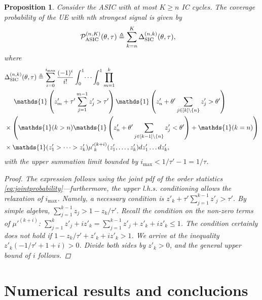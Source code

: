 \documentclass[lettersize,journal]{IEEEtran}
\newtheorem{prop}[theorem]{Proposition}
\begin{document}
\begin{prop}
  Consider the ASIC with at most $K \geq n$ IC cycles. The coverage probability of the UE with n\textit{th} strongest signal is given by
  \begin{align}
    &\mathcal{P}^{(n,K)}_{\textup{ASIC}}(\theta,\tau) \triangleq \sum_{k=n}^{K}\Delta^{(n,k)}_{\textup{SIC}}(\theta,\tau),
  \end{align}
  where
  \begin{align}
    \label{eq:SICprob}
    & \Delta^{(n,k)}_{\textup{SIC}}(\theta,\tau) \triangleq \sum^{i_{\text{max}}}_{i=0}\frac{(-1)^i}{i!} \int_{0}^{1} \dots \int_{0}^{1}\prod_{m=1}^k  \nonumber \\
    &\hspace{0.5cm}\mathds{1}\left( z'_m+ \tau'\sum_{j=1}^{m-1} z'_j>\tau' \right)  \mathds{1}\left(z'_n+  \theta'\sum_{j\in [k] \setminus \{n\}} z'_j>\theta' \right) \nonumber \\
    &\times \left(\mathds{1}(k>n)\mathds{1}\left(z'_n+ \theta'\sum_{j \in [k-1] \setminus \{n\}} z'_j<\theta' \right) + \mathds{1}(k=n) \right) \nonumber\\
    & \times \mathds{1}(z'_1>\dots>z'_k){\mu'}_k^{(k+i)}(z'_1,\dots,z'_k) d z'_1 \dots d z'_k,
  \end{align}
  with the upper summation limit bounded by $i_{\text{max}} < 1/\tau'-1=1/\tau$.
  \begin{proof}
    The expression follows using the joint pdf of the order statistics \eqref{eq:jointprobability}---furthermore, the upper l.h.s. conditioning  allows the relaxation of $i_{\text{max}}$. Namely, a necessary condition is $z'_{k}+\tau'\sum_{j=1}^{k-1}z'_{j}>\tau'$. By simple algebra, $\sum_{j=1}^{k-1}z_{j}> 1-z_{k}/\tau'$. Recall the condition on the non-zero terms of $\mu'^{(k+i)}$:  $\sum_{j=1}^k z'_{j}+i z'_{k} =\sum_{j=1}^{k-1}z'_{j} +z'_{k}+i z'_{k}  \leq 1$. The condition certainly does \textit{not} hold if $1-z_{k}/\tau'+ z'_{k}+i z'_{k}>1$. We arrive at the inequality $z'_{k} \left(-1/\tau' + 1 +i \right)>0$. Divide both sides by $z'_{k}>0$, and the general upper bound of $i$ follows.
  \end{proof}
\end{prop}




\section{Numerical results and conclucions}
  
\end{document}
